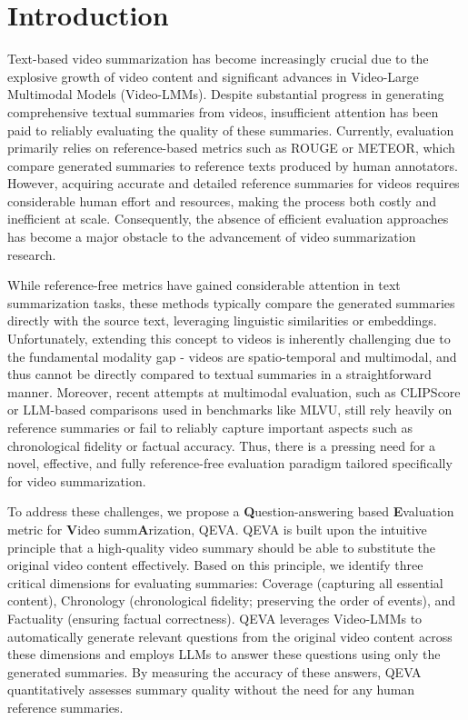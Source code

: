 \section{Introduction}
\label{sec:introduction}


Text-based video summarization has become increasingly crucial due to the explosive growth of video content and significant advances in Video-Large Multimodal Models (Video-LMMs). Despite substantial progress in generating comprehensive textual summaries from videos, insufficient attention has been paid to reliably evaluating the quality of these summaries. Currently, evaluation primarily relies on reference-based metrics such as ROUGE or METEOR, which compare generated summaries to reference texts produced by human annotators. However, acquiring accurate and detailed reference summaries for videos requires considerable human effort and resources, making the process both costly and inefficient at scale. Consequently, the absence of efficient evaluation approaches has become a major obstacle to the advancement of video summarization research.  



While reference-free metrics have gained considerable attention in text summarization tasks, these methods typically compare the generated summaries directly with the source text, leveraging linguistic similarities or embeddings. Unfortunately, extending this concept to videos is inherently challenging due to the fundamental modality gap - videos are spatio-temporal and multimodal, and thus cannot be directly compared to textual summaries in a straightforward manner. Moreover, recent attempts at multimodal evaluation, such as CLIPScore or LLM-based comparisons used in benchmarks like MLVU, still rely heavily on reference summaries or fail to reliably capture important aspects such as chronological fidelity or factual accuracy. Thus, there is a pressing need for a novel, effective, and fully reference-free evaluation paradigm tailored specifically for video summarization.  

To address these challenges, we propose a \textbf{Q}uestion-answering based \textbf{E}valuation metric for \textbf{V}ideo summ\textbf{A}rization, QEVA. QEVA is built upon the intuitive principle that a high-quality video summary should be able to substitute the original video content effectively. Based on this principle, we identify three critical dimensions for evaluating summaries: Coverage (capturing all essential content), Chronology (chronological fidelity; preserving the order of events), and Factuality (ensuring factual correctness). QEVA leverages Video-LMMs to automatically generate relevant questions from the original video content across these dimensions and employs LLMs to answer these questions using only the generated summaries. By measuring the accuracy of these answers, QEVA quantitatively assesses summary quality without the need for any human reference summaries.


